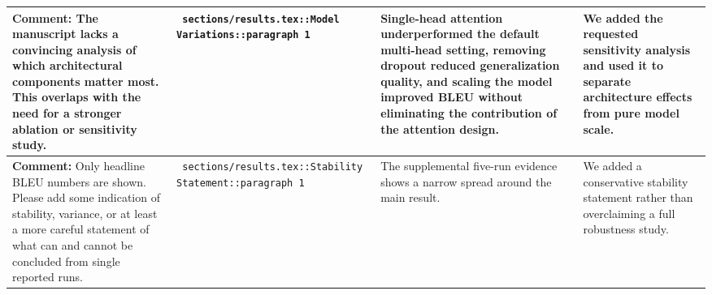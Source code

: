 \documentclass[11pt]{article}
\begin{document}
\begin{longtable}{|p{}|p{}|p{}|p{}|}
\hline
\textbf{ Comment: } The manuscript lacks a convincing analysis of which architectural components matter most. This overlaps with the need for a stronger ablation or sensitivity study. & \texttt{ sections/results.tex::Model Variations::paragraph 1 } & {\color{blue}\ttfamily Single-head attention underperformed the default multi-head setting, removing dropout reduced generalization quality, and scaling the model improved BLEU without eliminating the contribution of the attention design.} & We added the requested sensitivity analysis and used it to separate architecture effects from pure model scale. \\
\hline
\textbf{ Comment: } Only headline BLEU numbers are shown. Please add some indication of stability, variance, or at least a more careful statement of what can and cannot be concluded from single reported runs. & \texttt{ sections/results.tex::Stability Statement::paragraph 1 } & {\color{blue}\ttfamily The supplemental five-run evidence shows a narrow spread around the main result.} & We added a conservative stability statement rather than overclaiming a full robustness study. \\
\hline
\end{longtable}
\end{document}
